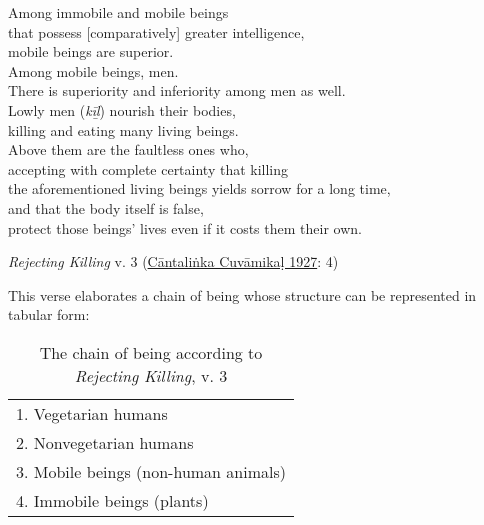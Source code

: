 \begin{pullquote}
	    Among immobile and mobile beings\\
            that possess [comparatively] greater intelligence,\\
	    mobile beings are superior.\\
	    Among mobile beings, men.\\
            There is superiority and inferiority among men as well.\\
	    Lowly men (\emph{kīḻ}) nourish their bodies,\\
            killing and eating many living beings.\\
	    Above them are the faultless ones who,\\
            accepting with complete certainty that killing\\
            the aforementioned living beings yields sorrow for a long time,\\
	    and that the body itself is false,\\
	    protect those beings’ lives even if it costs them their own.
	  

\medskip\hfill\begin{minipage}{0.9\textwidth}\small\hfill
\emph{Rejecting Killing} v. 3  (\hyperref[CantalinkaCuvamikal1927]{Cāntaliṅka Cuvāmikaḷ 1927}: 4)\end{minipage}\hspace{2em}
\end{pullquote}

This verse elaborates a chain of being whose structure can be represented in tabular form:


\begin{table}[ht!]\label{tab1}\centering
\caption{The chain of being according to \emph{Rejecting Killing}, v. 3}
\begin{tabular}{l}\toprule

	
	1. Vegetarian humans \\
      
	2. Nonvegetarian humans \\
      
	3. Mobile beings (non-human animals) \\
      
	4. Immobile beings (plants) \\\bottomrule
      
      
\end{tabular}
\end{table}
      

